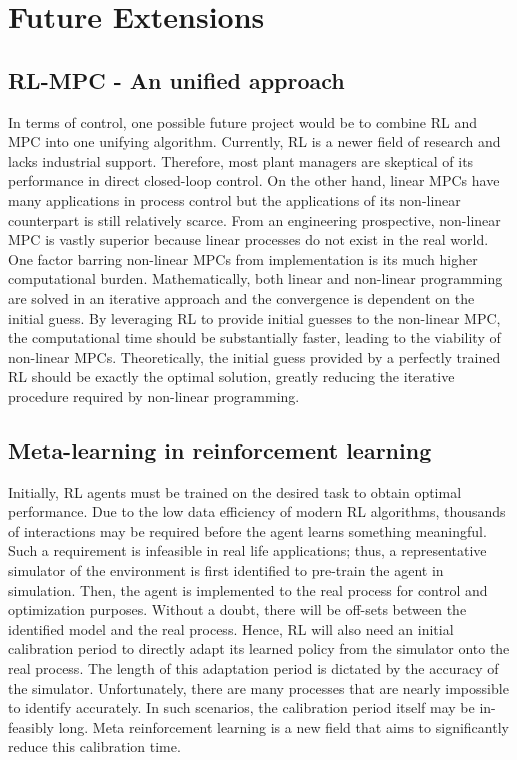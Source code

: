 \section{Future Extensions}
\subsection{RL-MPC - An unified approach}
In terms of control, one possible future project would be to combine RL and MPC into one unifying algorithm.  Currently, RL is a newer field of research and lacks industrial support. Therefore, most plant managers are skeptical of its performance in direct closed-loop control. On the other hand, linear MPCs have many applications in process control but the applications of its non-linear counterpart is still relatively scarce. From an engineering prospective, non-linear MPC is vastly superior because linear processes do not exist in the real world. One factor barring non-linear MPCs from implementation is its much higher computational burden. Mathematically, both linear and non-linear programming are solved in an iterative approach and the convergence is dependent on the initial guess.  By leveraging RL to provide initial guesses to the non-linear MPC, the computational time should be substantially faster, leading to the viability of non-linear MPCs. Theoretically, the initial guess provided by a perfectly trained RL should be exactly the optimal solution, greatly reducing the iterative procedure required by non-linear programming.  

\subsection{Meta-learning in reinforcement learning}
Initially, RL agents must be trained on the desired task to obtain optimal performance.  Due to the low data efficiency of modern RL algorithms, thousands of interactions may be required before the agent learns something meaningful.  Such a requirement is infeasible in real life applications; thus, a representative simulator of the environment is first identified to pre-train the agent in simulation.  Then, the agent is implemented to the real process for control and optimization purposes.  Without a doubt, there will be off-sets between the identified model and the real process. Hence, RL will also need an initial calibration period to directly adapt its learned policy from the simulator onto the real process.  The length of this adaptation period is dictated by the accuracy of the simulator.  Unfortunately, there are many processes that are nearly impossible to identify accurately.  In such scenarios, the calibration period itself may be in-feasibly long. Meta reinforcement learning is a new field that aims to significantly reduce this calibration time.

